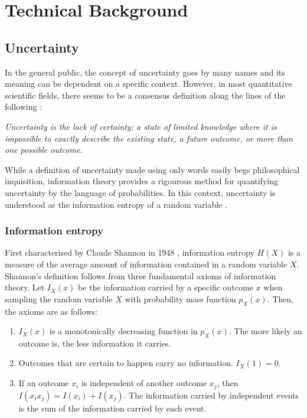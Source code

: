 

\chapter[technical background]{Technical Background}\label{chp:technical-background}

\section{Uncertainty}


In the general public, the concept of uncertainty goes by many names and its meaning can be dependent on a specific context. However, in most quantitative scientific fields, there seems to be a consensus definition along the lines of the following \cite{hubbard_how_2014}:

\begin{center}
    \textit{Uncertainty is the lack of certainty; a state of limited knowledge where it is impossible to exactly describe the existing state, a future outcome, or more than one possible outcome.}
\end{center}

While a definition of uncertainty made using only words easily begs philosophical inquisition, information theory provides a rigourous method for quantifying uncertainty \cite{kabir_neural_2018} by the language of probabilities. 
In this context, uncertainty is understood as the information entropy of a random variable \cite{mackay_information_2003}. 

\subsection{Information entropy}
First characterised by Claude Shannon in 1948 \cite{shannon_mathematical_1948}, information entropy $H(X)$ is a measure of the average amount of information contained in a random variable $X$. Shannon's definition follows from three fundamental axioms of information theory. Let $I_X(x)$ be the information carried by a specific outcome $x$ when sampling the random variable $X$ with probability mass function $p_X(x)$. Then, the axioms are as follows:
\begin{enumerate}
    \item  $I_X(x)$ is a monotonically decreasing function in $p_X(x)$. The more likely an outcome is, the less information it carries.
    \item Outcomes that are certain to happen carry no information. $I_X(1) = 0$.
    \item If an outcome $x_i$ is independent of another outcome $x_j$, then $I(x_i x_j) = I(x_i) + I(x_j)$. The information carried by independent events is the sum of the information carried by each event.
\end{enumerate}

